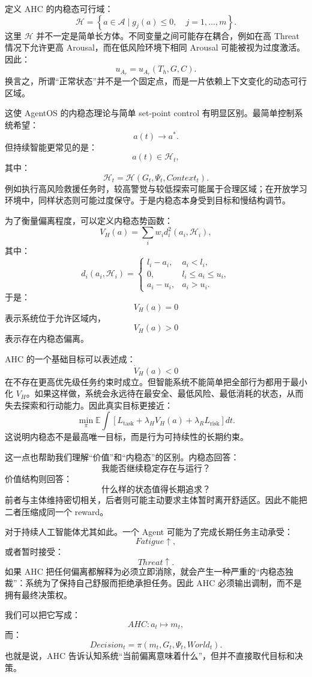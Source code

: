 定义 AHC 的内稳态可行域：
\[
\boxed{
\mathcal H
=
\left\{
a\in\mathcal A
\mid
g_j(a)\leq 0,
\quad
j=1,\ldots,m
\right\}.
}
\]
这里 \(\mathcal H\) 并不一定是简单长方体。不同变量之间可能存在耦合，例如在高 Threat 情况下允许更高 Arousal，而在低风险环境下相同 Arousal 可能被视为过度激活。因此：
\[
u_{A_r}
=
u_{A_r}(T_h,G,C).
\]
换言之，所谓“正常状态”并不是一个固定点，而是一片依赖上下文变化的动态可行区域。

这使 AgentOS 的内稳态理论与简单 set-point control 有明显区别。最简单控制系统希望：
\[
a(t)\rightarrow a^\ast.
\]
但持续智能更常见的是：
\[
a(t)\in\mathcal H_t,
\]
其中：
\[
\mathcal H_t
=
\mathcal H
(G_t,\Psi_t,Context_t).
\]
例如执行高风险救援任务时，较高警觉与较低探索可能属于合理区域；在开放学习环境中，同样状态则可能过度保守。于是内稳态本身受到目标和慢结构调节。

为了衡量偏离程度，可以定义内稳态势函数：
\[
V_H(a)
=
\sum_i
w_i
d_i^2(a_i,\mathcal H_i),
\]
其中：
\[
d_i(a_i,\mathcal H_i)
=
\begin{cases}
l_i-a_i,&a_i<l_i,\\
0,&l_i\leq a_i\leq u_i,\\
a_i-u_i,&a_i>u_i.
\end{cases}
\]
于是：
\[
V_H(a)=0
\]
表示系统位于允许区域内，
\[
V_H(a)>0
\]
表示存在内稳态偏离。

AHC 的一个基础目标可以表述成：
\[
\dot V_H(a)<0
\]
在不存在更高优先级任务约束时成立。但智能系统不能简单把全部行为都用于最小化 \(V_H\)。如果这样做，系统会永远待在最安全、最低风险、最低消耗的状态，从而失去探索和行动能力。因此真实目标更接近：
\[
\min_\pi
\mathbb E
\int
\left[
L_{\mathrm{task}}
+
\lambda_H V_H(a)
+
\lambda_R L_{\mathrm{risk}}
\right]dt .
\]
这说明内稳态不是最高唯一目标，而是行为可持续性的长期约束。

这一点也帮助我们理解“价值”和“内稳态”的区别。内稳态回答：
\[
\text{我能否继续稳定存在与运行？}
\]
价值结构则回答：
\[
\text{什么样的状态值得长期追求？}
\]
前者与主体维持密切相关，后者则可能主动要求主体暂时离开舒适区。因此不能把二者压缩成同一个 reward。

对于持续人工智能体尤其如此。一个 Agent 可能为了完成长期任务主动承受：
\[
Fatigue\uparrow,
\]
或者暂时接受：
\[
Threat\uparrow.
\]
如果 AHC 把任何偏离都解释为必须立即消除，就会产生一种严重的“内稳态独裁”：系统为了保持自己舒服而拒绝承担任务。因此 AHC 必须输出调制，而不是拥有最终决策权。

我们可以把它写成：
\[
AHC:
a_t\mapsto m_t,
\]
而：
\[
Decision_t
=
\pi
(m_t,G_t,\Psi_t,World_t).
\]
也就是说，AHC 告诉认知系统“当前偏离意味着什么”，但并不直接取代目标和决策。

